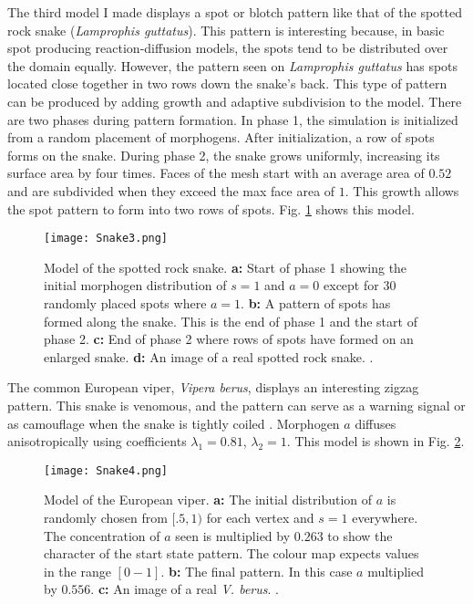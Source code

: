 \newpage

The third model I made displays a spot or blotch pattern like that of the spotted rock snake (\textit{Lamprophis guttatus}). This pattern is interesting because, in basic spot producing reaction-diffusion models, the spots tend to be distributed over the domain equally. However, the pattern seen on \textit{Lamprophis guttatus} has spots located close together in two rows down the snake's back. This type of pattern can be produced by adding growth and adaptive subdivision to the model. There are two phases during pattern formation. In phase 1, the simulation is initialized from a random placement of morphogens. After initialization, a row of spots forms on the snake. During phase 2, the snake grows uniformly, increasing its surface area by four times. Faces of the mesh start with an average area of $0.52$ and are subdivided when they exceed the max face area of $1$. This growth allows the spot pattern to form into two rows of spots. Fig. \ref{fig:Snake3} shows this model.

\begin{figure}[ht]
	\centering
	\texttt{[image: Snake3.png]}
	\caption[Model of the spotted rock snake]{Model of the spotted rock snake. \textbf{a:} Start of phase 1 showing the initial morphogen distribution of $s=1$ and $a=0$ except for 30 randomly placed spots where $a=1$. \textbf{b:} A pattern of spots has formed along the snake. This is the end of phase 1 and the start of phase 2. \textbf{c:} End of phase 2 where rows of spots have formed on an enlarged snake. \textbf{d:} An image of a real spotted rock snake. .}
	\label{fig:Snake3}
\end{figure}

\newpage


The common European viper, \textit{Vipera berus}, displays an interesting zigzag pattern. This snake is venomous, and the pattern can serve as a warning signal or as camouflage when the snake is tightly coiled \citep{lillywhite2014}. Morphogen $a$ diffuses anisotropically using coefficients $\lambda_{1}=0.81$, $\lambda_{2}=1$. This model is shown in Fig. \ref{fig:Snake4}.

\begin{figure}[ht]
	\centering
	\texttt{[image: Snake4.png]}
	\caption[Model of the European viper]{Model of the European viper. \textbf{a:} The initial distribution of $a$ is randomly chosen from $[.5, 1)$ for each vertex and $s=1$ everywhere. The concentration of $a$ seen is multiplied by $0.263$ to show the character of the start state pattern. The colour map expects values in the range $[0-1]$. \textbf{b:} The final pattern. In this case $a$ multiplied by $0.556$. \textbf{c:} An image of a real \textit{V. berus}. .}
	\label{fig:Snake4}
\end{figure}

